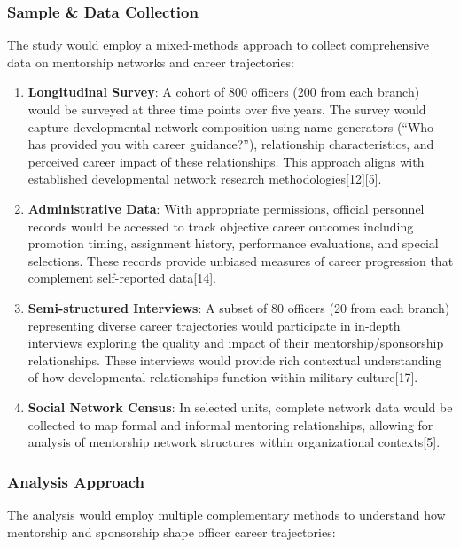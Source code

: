 \documentclass[
  letterpaper,
  DIV=11,
  numbers=noendperiod]{scrartcl}
\begin{document}
\subsubsection{Sample \& Data Collection}\label{sample-data-collection}

The study would employ a mixed-methods approach to collect comprehensive
data on mentorship networks and career trajectories:

\begin{enumerate}
\def\labelenumi{\arabic{enumi}.}
\item
  \textbf{Longitudinal Survey}: A cohort of 800 officers (200 from each
  branch) would be surveyed at three time points over five years. The
  survey would capture developmental network composition using name
  generators (``Who has provided you with career guidance?''),
  relationship characteristics, and perceived career impact of these
  relationships. This approach aligns with established developmental
  network research methodologies{[}12{]}{[}5{]}.
\item
  \textbf{Administrative Data}: With appropriate permissions, official
  personnel records would be accessed to track objective career outcomes
  including promotion timing, assignment history, performance
  evaluations, and special selections. These records provide unbiased
  measures of career progression that complement self-reported
  data{[}14{]}.
\item
  \textbf{Semi-structured Interviews}: A subset of 80 officers (20 from
  each branch) representing diverse career trajectories would
  participate in in-depth interviews exploring the quality and impact of
  their mentorship/sponsorship relationships. These interviews would
  provide rich contextual understanding of how developmental
  relationships function within military culture{[}17{]}.
\item
  \textbf{Social Network Census}: In selected units, complete network
  data would be collected to map formal and informal mentoring
  relationships, allowing for analysis of mentorship network structures
  within organizational contexts{[}5{]}.
\end{enumerate}

\subsubsection{Analysis Approach}\label{analysis-approach}

The analysis would employ multiple complementary methods to understand
how mentorship and sponsorship shape officer career trajectories:
\end{document}
